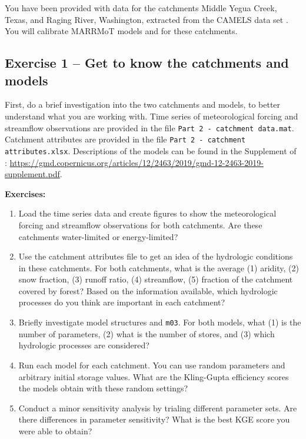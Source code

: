 \documentclass[12pt]{article}
\begin{document}
You have been provided with data for the catchments Middle Yegua Creek, Texas, and Raging River, Washington, extracted from the CAMELS data set \citep{Addor2017}. You will calibrate MARRMoT models  and  \citep{Knoben2019} for these catchments. 

%
\subsection{Exercise 1 – Get to know the catchments and models}

First, do a brief investigation into the two catchments and models, to better understand what you are working with. Time series of meteorological forcing and streamflow observations are provided in the file \texttt{Part 2 - catchment data.mat}. Catchment attributes are provided in the file \texttt{Part 2 - catchment attributes.xlsx}. Descriptions of the models can be found in the Supplement of \citet{Knoben2019}: \url{https://gmd.copernicus.org/articles/12/2463/2019/gmd-12-2463-2019-supplement.pdf}. 

\medskip \noindent
\textbf{Exercises:}
\begin{enumerate}
	\item Load the time series data and create figures to show the meteorological forcing and streamflow observations for both catchments. Are these catchments water-limited or energy-limited?
	\item Use the catchment attributes file to get an idea of the hydrologic conditions in these catchments. For both catchments, what is the average (1) aridity, (2) snow fraction, (3) runoff ratio, (4) streamflow, (5) fraction of the catchment covered by forest? Based on the information available, which hydrologic processes do you think are important in each catchment?
	\item Briefly investigate model structures  and \texttt{m03}. For both models, what (1) is the number of parameters, (2) what is the number of stores, and (3) which hydrologic processes are considered? 
	\item Run each model for each catchment. You can use random parameters and arbitrary initial storage values. What are the Kling-Gupta efficiency scores the models obtain with these random settings?
	\item Conduct a minor sensitivity analysis by trialing different parameter sets. Are there differences in parameter sensitivity? What is the best KGE score you were able to obtain?
\end{enumerate}
\end{document}

